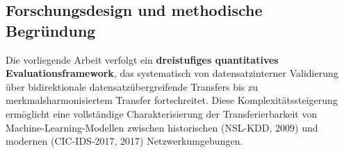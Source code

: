 \documentclass[11pt,a4paper]{article}
\begin{document}
    \subsection{Forschungsdesign und methodische Begründung}

    Die vorliegende Arbeit verfolgt ein \textbf{dreistufiges quantitatives Evaluationsframework}, das systematisch von datensatzinterner Validierung über bidirektionale datensatzübergreifende Transfers bis zu merkmalsharmonisiertem Transfer fortschreitet. Diese Komplexitätssteigerung ermöglicht eine vollständige Charakterisierung der Transferierbarkeit von Machine-Learning-Modellen zwischen historischen (NSL-KDD, 2009) und modernen (CIC-IDS-2017, 2017) Netzwerkumgebungen.
\end{document}

